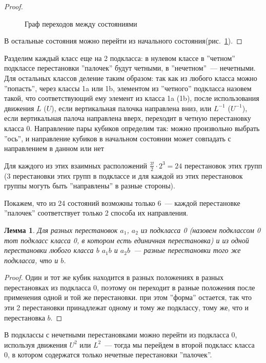 \documentclass[utf8,a4paper,draft]{article}
\newtheorem{lemma_cub}{Лемма}[section]
\begin{document}
\begin{proof}
\begin{figure}[h]
\caption{Граф переходов между состояниями\label{states_graph}}
\end{figure}
В остальные состояния можно перейти из начального состояния(рис.~\ref{states_graph}).
\end{proof}
Разделим каждый класс еще на 2 подкласса: в нулевом классе в ''четном'' подклассе перестановки ''палочек''  будут четными, в ''нечетном''~--- нечетными. Для остальных классов деление таким образом: так как из любого класса можно ''попасть'', через классы 1a или 1b, элементом из ''четного'' подкласса назовем такой, что соответствующий ему элемент из класса 1a (1b), после использования движения $L$ ($U$), если вертикальная палочка направлена вниз, или $L^{-1}$ ($U^{-1}$), если вертикальная палоча направлена вверх, переходит в четную перестановку класса 0. Направление пары кубиков определим так: можно произвольно выбрать ''ось'', и направление кубиков в начальном состоянии может совпадать с направлением в данном или нет

Для каждого из этих взаимных расположений $\frac{3!}{2}\cdot 2^3=24$ перестановок этих групп (3 перестановки этих групп в подклассе и для каждой из этих перестановок группы могуть быть ''направлены'' в разные стороны).

Покажем, что из 24 состояний возможны только 6~--- каждой перестановке ''палочек'' соответствует только 2 способа их направления.
\begin{lemma_cub}
Для разных перестановок $a_1$, $a_2$ из подкласса 0 (назовем подклассом 0 тот подкласс класса 0, в котором есть единичная перестановка) и из одной перестановки любого класса $b$ $a_1b$ и $a_2b$~--- разные перестановки того же подкласса, что и $b$.\label{lemma_classes}
\end{lemma_cub}
\begin{proof}
Один и тот же кубик находится в разных положениях в разных перестановках из подкласса 0, поэтому он переходит в разные положения после применения одной и той же перестановки. при этом ''форма'' остается, так что эти 2 перестановки принадлежат одному и тому же подклассу, тому же, что и перестановка $b$.
\end{proof}
В подклассы с нечетными перестановками можно перейти из подкласса 0, используя движения $U^2$ или $L^2$~--- тогда мы перейдем в второй подкласс класса 0, в котором содержатся только нечетные перестановки ''палочек''.
\end{document}
